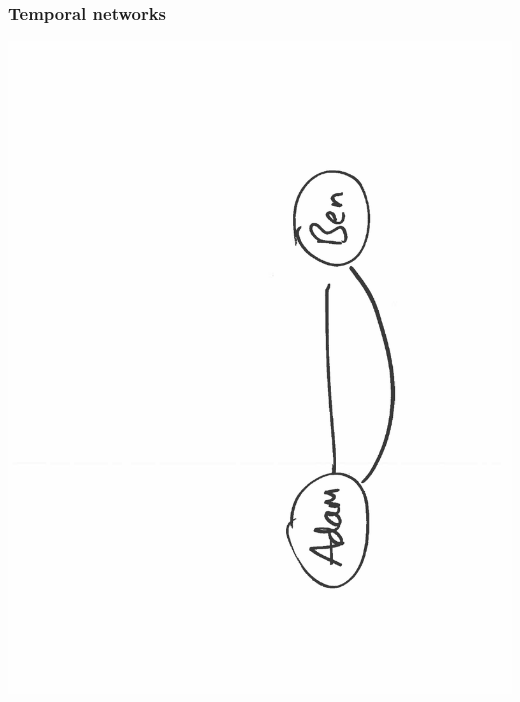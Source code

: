 \documentclass[final,hyperref={pdfpagelabels=false},noamsthm]{beamer}
\begin{document}
\begin{frame}
	\frametitle{Temporal networks}
	\includegraphics[angle=270,origin=c,scale=0.4]{fig/socialnet2}
\end{frame}
\end{document}
